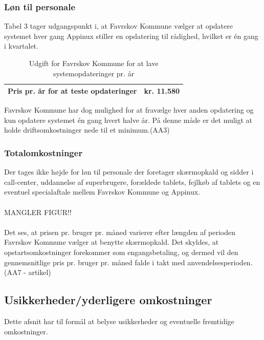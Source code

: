 \subsubsection{Løn til personale}
Tabel 3 tager udgangspunkt i, at Favrskov Kommune vælger at opdatere systemet hver gang Appinux stiller en opdatering til rådighed, hvilket er én gang i kvartalet. 

\begin{table}[H]
	\caption{Udgift for Favrskov Kommune for at lave systemopdateringer pr. år}
	\centering
	\label{tab:tabelpersonaleudgift}
	\begin{tabularx}{\textwidth}{|X|X|}
		\hline
		Pris pr. år for at teste opdateringer
		& kr. 11.580\\ 
		\hline
	\end{tabularx}
\end{table}
Favrskov Kommune har dog mulighed for at fravælge hver anden opdatering og kun opdatere systemet én gang hvert halve år. På denne måde er det muligt at holde driftsomkostninger nede til et minimum.(AA3) 
\subsubsection{Totalomkostninger}
Der tages ikke højde for løn til personale der foretager skærmopkald og sidder i call-center, uddannelse af superbrugere, forældede tablets, fejlkøb af tablets og en eventuel specialaftale mellem Favrskov Kommune og Appinux.\\ \\

MANGLER FIGUR!!\\ \\

Det ses, at prisen pr. bruger pr. måned varierer efter længden af perioden Favrskov Kommune vælger at benytte skærmopkald. Det skyldes, at opstartsomkostninger forekommer som engangsbetaling, og dermed vil den gennemsnitlige pris pr. bruger pr. måned falde i takt med anvendelsesperioden. 
(AA7 - artikel)
\subsection{Usikkerheder/yderligere omkostninger}
Dette afsnit har til formål at belyse usikkerheder og eventuelle fremtidige omkostninger. 

